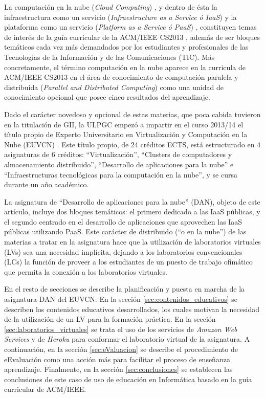 \documentclass[conference]{IEEEtran}
\begin{document}
La computación en la nube (\textit{Cloud Computing}) \cite{Buyya:2013}, y dentro
de ésta la infraestructura como un servicio (\textit{Infraestructure as a Service ó IaaS})
y la plataforma como un servicio (\textit{Platform as a Service ó PaaS})
\cite{Carlson:2013},
constituyen temas de interés de la guía curricular de la ACM/IEEE CS2013 \cite{acm:2013},
además de ser bloques temáticos cada vez más demandados por los estudiantes y
profesionales de las Tecnologías de la Información y de las Comunicaciones
(TIC). Más concretamente, el término computación en la nube aparece en la curricula de ACM/IEEE CS2013 
en el área de conocimiento de computación paralela y distribuida (\textit{Parallel and Distributed Computing})
como una unidad de conocimiento opcional que posee cinco resultados del aprendizaje.

Dado el carácter novedoso y opcional de estas materias, que poca cabida tuvieron en la
titulación de GII, la ULPGC empezó a impartir en el curso 2013/14 el título propio de Experto Universitario en
Virtualización y Computación en la Nube (EUVCN) \cite{Experto:2014}. Este título
propio, de 24 créditos ECTS, está estructurado en 4 asignaturas de 6 créditos:
``Virtualización'', ``Clusters de computadores y almacenamiento distribuido'', ``Desarrollo de
aplicaciones para la nube'' e ``Infraestructuras tecnológicas para la
computación en la nube'', y se cursa durante un año académico.

La asignatura de ``Desarrollo de aplicaciones para la nube'' (DAN), objeto de este artículo, incluye dos
bloques temáticos: el primero dedicado a las IaaS públicas, y el segundo centrado en el desarrollo de aplicaciones 
que aprovechen las IaaS públicas utilizando PaaS. Este carácter de distribuido (``o en la nube'') de las
materias a tratar en la asignatura hace que la utilización de laboratorios virtuales (LVs) \cite{Zhang:2010} sea 
una necesidad implícita, dejando a los laboratorios convencionales (LCs) la función de proveer a los estudiantes de un puesto de trabajo
ofimático que permita la conexión a los laboratorios virtuales.


En el resto de secciones se describe la planificación y puesta en marcha de la asignatura
DAN del EUVCN. En  la sección \ref{sec:contenidos_educativos} se describen los
contenidos educativos desarrollados, los cuales motivan la necesidad de la
utilización de un LV para la formación práctica. En la sección
\ref{sec:laboratorios_virtuales} se trata el uso de los servicios de
\textit{Amazon Web Services} \cite{AWS:2011} y de \textit{Heroku}
\cite{Heroku:2013} para conformar el laboratorio virtual de la asignatura. A continuación, en 
la sección \ref{sec:eValuacion} se describe el procedimiento de eEvaluación \cite{Moral2013} como 
una acción más para facilitar el proceso de enseñanza aprendizaje. Finalmente, en la sección
\ref{sec:conclusiones} se establecen las conclusiones de este caso de uso de
educación en Informática basado en la guía curricular de ACM/IEEE.
\end{document}
